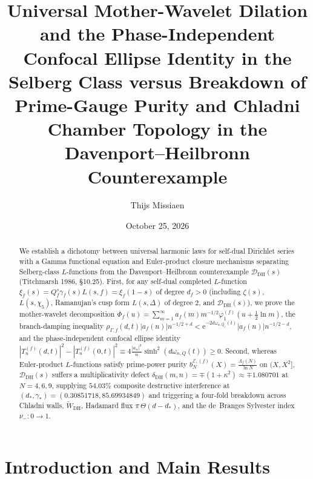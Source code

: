 \documentclass[11pt,reqno]{amsart}
\title[Automorphic $L$-Functions vs.\ Davenport--Heilbronn Breakdown]{Universal Mother-Wavelet Dilation and the Phase-Independent Confocal Ellipse Identity in the Selberg Class versus Breakdown of Prime-Gauge Purity and Chladni Chamber Topology in the Davenport--Heilbronn Counterexample}
\author{Thijs Missiaen}
\date{October 25, 2026}
\theoremstyle{definition}
\theoremstyle{remark}
\numberwithin{equation}{section}
\newcommand{\ee}{\mathrm{e}}
\newcommand{\DHf}{\mathrm{DH}}
\begin{document}
\sloppy

\begin{abstract}
We establish a dichotomy between universal harmonic laws for self-dual Dirichlet series with a Gamma functional equation and Euler-product closure mechanisms separating Selberg-class $L$-functions from the Davenport--Heilbronn counterexample $\mathcal{D}_{\DHf}(s)$ (Titchmarsh 1986, \S10.25). First, for any self-dual completed $L$-function $\xi_f(s) = Q_f^s\gamma_f(s)L(s,f) = \xi_f(1-s)$ of degree $d_f > 0$ (including $\zeta(s)$, $L(s,\chi_5)$, Ramanujan's cusp form $L(s,\Delta)$ of degree $2$, and $\mathcal{D}_{\DHf}(s)$), we prove the mother-wavelet decomposition $\Phi_f(u) = \sum_{m=1}^\infty a_f(m)m^{-1/2}\varphi_1^{(f)}(u + \frac{1}{2}\ln m)$, the branch-damping inequality $\rho_{\Gamma,f}(d,t)|a_f(n)|n^{-1/2+d} < \ee^{-2d\omega_{n,Q_f}(t)}|a_f(n)|n^{-1/2-d}$, and the phase-independent confocal ellipse identity $|T_n^{(f)}(d,t)|^2 - |T_n^{(f)}(0,t)|^2 \equiv 4\frac{|a_n|^2}{n}\sinh^2(d\omega_{n,Q}(t)) \ge 0$. Second, whereas Euler-product $L$-functions satisfy prime-power purity $b_N^{\mathcal{E},(f)}(X) = \frac{\Lambda_f(N)}{\ln N}$ on $(X, X^2]$, $\mathcal{D}_{\DHf}(s)$ suffers a multiplicativity defect $\delta_{\DHf}(m,n) = \mp(1+\kappa^2) \approx \mp 1.080701$ at $N = 4, 6, 9$, supplying $54.03\%$ composite destructive interference at $(d_*, \gamma_*) = (0.30851718, 85.69934849)$ and triggering a four-fold breakdown across Chladni walls, $\widetilde{W}_{\DHf}$, Hadamard flux $\pi\,\Theta(d-d_*)$, and the de~Branges Sylvester index $\nu_- : 0 \to 1$.
\end{abstract}

\maketitle

\section{Introduction and Main Results}\label{sec:intro}
\end{document}
